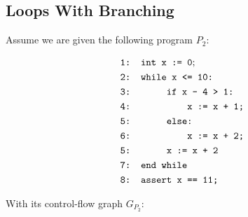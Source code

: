 \documentclass{article}
\begin{document}
\subsection{Loops With Branching}
Assume we are given the following program $P_2$: \\
\begin{figure}[H]
	\begin{align*}
		&\texttt{1: int x := 0}; \\
		&\texttt{2: while x <= 10:} \\
		&\texttt{3: \hspace*{2em} if x - 4 > 1:} \\
		&\texttt{4: \hspace*{4em} x := x + 1;} \\
		&\texttt{5: \hspace*{2em} else:} \\
		&\texttt{6: \hspace*{4em} x := x + 2;} \\
		&\texttt{5: \hspace*{2em} x := x + 2} \\
		&\texttt{7: end while} \\
		&\texttt{8: assert x == 11;}
	\end{align*}
	\label{fig:square}
\end{figure}
With its control-flow graph $G_{P_2}$: \\
\end{document}
